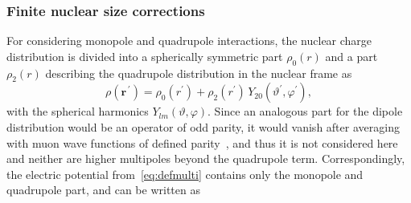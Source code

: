 \subsubsection{Finite nuclear size corrections}
\label{sec:radialEq}
For considering monopole and quadrupole interactions, the nuclear charge distribution is divided into a spherically symmetric part $\rho_0(r)$ and a part $\rho_2(r)$ describing the quadrupole distribution in the nuclear frame as~\cite{hitlin1970}
\begin{equation}
\label{eq:rho}
\rho(\mathbf{r}^{\,\prime}) = \rho_0(r^{\prime}) + \rho_2(r^{\prime}) \, Y_{20}(\vartheta^\prime,\varphi^\prime),
\end{equation}
with the spherical harmonics $Y_{lm}(\vartheta,\varphi)$. Since an analogous part for the dipole distribution would be an operator of odd parity, it would vanish after averaging with muon wave functions of defined parity~\cite{johnson2007}, and thus it is not considered here and neither are higher multipoles beyond the quadrupole term. Correspondingly, the electric potential from~\eqref{eq:defmulti} contains only the monopole and quadrupole part, and can be written as
